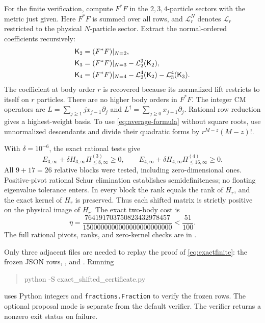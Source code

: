 \documentclass[11pt]{article}
\begin{document}
For the finite verification,
compute $F^*F$ in the $2,3,4$-particle sectors with the metric just given.
Here $F^*F$ is summed over all rows, and $\mathcal L_r^N$ denotes
$\mathcal L_r$ restricted to the physical $N$-particle sector.
Extract the normal-ordered coefficients recursively:
\begin{align}
 \mathsf K_2&=(F^*F)|_{N=2},\notag\\
 \mathsf K_3&=(F^*F)|_{N=3}-\mathcal L_2^3(\mathsf K_2),\notag\\
 \mathsf K_4&=(F^*F)|_{N=4}-\mathcal L_2^4(\mathsf K_2)
                                      -\mathcal L_3^4(\mathsf K_3).
\end{align}
The coefficient at body order $r$ is recovered because its normalized lift
restricts to itself on $r$ particles. There are no higher body orders in
$F^*F$. The integer CM operators are
$L=\sum_{j\ge1}j x_{j-1}\partial_j$ and
$L^\dagger=\sum_{j\ge0}x_{j+1}\partial_j$.
Rational row reduction gives a highest-weight basis. To use
\eqref{eq:average-formula} without square roots, use unnormalized descendants
and divide their quadratic forms by $r^{M-z}(M-z)!$.

With $\delta=10^{-6}$, the exact rational tests give
\begin{equation}\label{eq:exactfinite}
 E_{3,\infty}+\delta H_{3,\infty}\Pi^{(3)}_{\le8,\infty}\ge0,
 \qquad
 E_{4,\infty}+\delta H_{4,\infty}\Pi^{(4)}_{\le16,\infty}\ge0.
\end{equation}
All $9+17=26$ relative blocks were tested, including zero-dimensional ones.
Positive-pivot rational Schur elimination establishes semidefiniteness;
no floating eigenvalue tolerance enters. In every block the rank equals
the rank of $H_r$, and the exact kernel of $H_r$ is preserved. Thus each
shifted matrix is strictly positive on the physical image of $H_r$.
The exact two-body cost is
\begin{equation}\label{eq:eta}
 \eta=\frac{764191703750823432978457}{1500000000000000000000000}
       <\frac{51}{100}.
\end{equation}
The full rational pivots, ranks, and zero-kernel checks are in
.

Only three adjacent files are needed to replay the proof of
\eqref{eq:exactfinite}: the frozen JSON rows,
, and
. Running
\begin{quote}\ttfamily python -S exact\_shifted\_certificate.py\end{quote}
uses Python integers and
\texttt{fractions.Fraction} to verify the frozen rows. The optional proposal
mode is separate from the default verifier. The verifier returns a nonzero exit status on failure.
\end{document}

